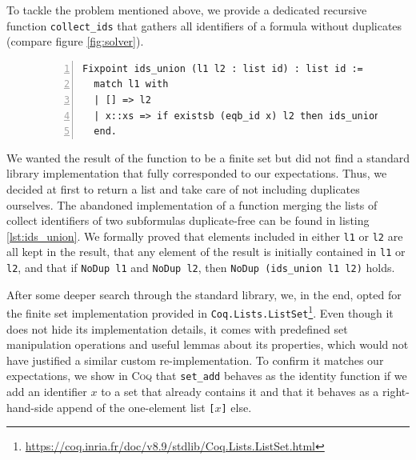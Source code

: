 To tackle the problem mentioned above, we provide a dedicated recursive function \texttt{collect\_ids} that gathers all identifiers of a formula without duplicates (compare figure \ref{fig:solver}).

\begin{figure}[t]
    \begin{lstlisting}[language=coq,numbers=left,numberstyle=\tiny,label=lst:ids_union,caption=Custom duplicate-free list merging function.]
Fixpoint ids_union (l1 l2 : list id) : list id :=
  match l1 with
  | [] => l2
  | x::xs => if existsb (eqb_id x) l2 then ids_union xs l2 else ids_union xs (x :: l2)
  end.
    \end{lstlisting}
\end{figure}

We wanted the result of the function to be a finite set but did not find a standard library implementation that fully corresponded to our expectations.
Thus, we decided at first to return a list and take care of not including duplicates ourselves.
The abandoned implementation of a function merging the lists of collect identifiers of two subformulas duplicate-free can be found in listing \ref{lst:ids_union}.
We formally proved that elements included in either \texttt{l1} or \texttt{l2} are all kept in the result, that any element of the result is initially contained in \texttt{l1} or \texttt{l2}, and that if \texttt{NoDup l1} and \texttt{NoDup l2}, then \texttt{NoDup (ids\_union l1 l2)} holds.

After some deeper search through the standard library, we, in the end, opted for the finite set implementation provided in \texttt{Coq.Lists.ListSet}\footnote{\url{https://coq.inria.fr/doc/v8.9/stdlib/Coq.Lists.ListSet.html}}.
Even though it does not hide its implementation details, it comes with predefined set manipulation operations and useful lemmas about its properties, which would not have justified a similar custom re-implementation.
To confirm it matches our expectations, we show in \textsc{Coq} that \texttt{set\_add} behaves as the identity function if we add an identifier $x$ to a set that already contains it and that it behaves as a right-hand-side append of the one-element list \texttt{[$x$]} else.

